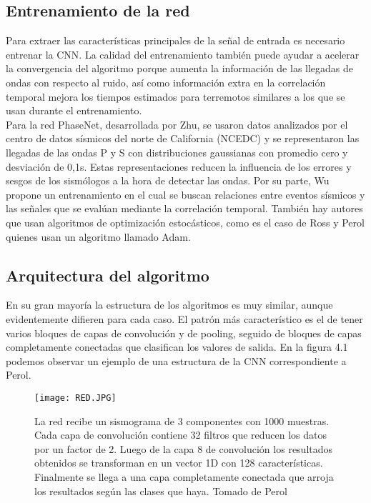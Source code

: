 \documentclass[../main.tex]{subfiles}
\begin{document}
\subsection{Entrenamiento de la red}

Para extraer las características principales de la señal de entrada es necesario entrenar la CNN. La calidad del entrenamiento también puede ayudar a acelerar la convergencia del algoritmo porque aumenta la información de las llegadas de ondas con respecto al ruido, así como información extra en la correlación temporal mejora los tiempos estimados para terremotos similares a los que se usan durante el entrenamiento.\\

Para la red PhaseNet, desarrollada por Zhu, se usaron datos analizados por el centro de datos sísmicos del norte de California (NCEDC) y se representaron las llegadas de las ondas P y S con distribuciones gaussianas con promedio cero y desviación de 0,1s. Estas representaciones reducen la influencia de los errores y sesgos de los sismólogos a la hora de detectar las ondas. Por su parte, Wu propone un entrenamiento en el cual se buscan relaciones entre eventos sísmicos y las señales que se evalúan mediante la correlación temporal. También hay autores que usan algoritmos de optimización estocásticos, como es el caso de Ross y Perol quienes usan un algoritmo llamado Adam.

\subsection{Arquitectura del algoritmo}

En su gran mayoría la estructura de los algoritmos es muy similar, aunque evidentemente difieren para cada caso. El patrón más característico es el de tener varios bloques de capas de convolución y de pooling, seguido de bloques de capas completamente conectadas que clasifican los valores de salida. En la figura 4.1 podemos observar un ejemplo de una estructura de la CNN correspondiente a Perol.  \\

\begin{figure}[h]
    \centering
    \texttt{[image: RED.JPG]}
    \label{fig:reda}
    \centering
    \caption{\centering La red recibe un sismograma de 3 componentes con 1000 muestras. Cada capa de convolución contiene 32 filtros que reducen los datos por un factor de 2. Luego de la capa 8 de convolución los resultados obtenidos se transforman en un vector 1D con 128 características. Finalmente se llega a una capa completamente conectada que arroja los resultados según las clases que haya. Tomado de Perol}
\end{figure}
\end{document}
